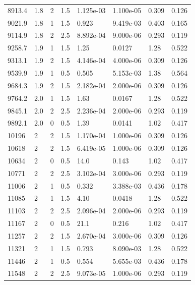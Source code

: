 \documentclass[preview]{standalone}
\begin{document}
{{{\begin{tabular}{L{1.2cm}C{1.2cm} C{0.3cm}C{0.5cm} C{1.4cm}C{1.4cm} C{1.4cm}C{1.4cm}}
  8913.4  &   1.8  & 2     & 1.5 &  1.125e-03  & 1.100e-05  & 0.309 &  0.126   \\ 
  9021.9  &   1.8  & 1     & 1.5 &  0.923  & 9.419e-03  & 0.403 &  0.165   \\ 
  9114.9  &   1.8  & 2     & 2.5 &  8.892e-04  & 9.000e-06  & 0.293 &  0.119   \\ 
  9258.7  &   1.9  & 1     & 1.5 &  1.25  & 0.0127  & 1.28 &  0.522   \\ 
  9313.1  &   1.9  & 2     & 1.5 &  4.146e-04  & 4.000e-06  & 0.309 &  0.126   \\ 
  9539.9  &   1.9  & 1     & 0.5 &  0.505  & 5.153e-03  & 1.38 &  0.564   \\ 
  9684.3  &   1.9  & 2     & 1.5 &  2.182e-04  & 2.000e-06  & 0.309 &  0.126   \\ 
  9764.2  &   2.0  & 1     & 1.5 &  1.63  & 0.0167  & 1.28 &  0.522   \\ 
  9845.1  &   2.0  & 2     & 2.5 &  2.236e-04  & 2.000e-06  & 0.293 &  0.119   \\ 
  9892.1  &   2.0  & 0     & 0.5 &  1.39  & 0.0141  & 1.02 &  0.417   \\ 
  10196  &     2  & 2     & 1.5 &  1.170e-04  & 1.000e-06  & 0.309 &  0.126   \\ 
  10618  &     2  & 2     & 1.5 &  6.419e-05  & 1.000e-06  & 0.309 &  0.126   \\ 
  10634  &     2  & 0     & 0.5 &  14.0  & 0.143  & 1.02 &  0.417   \\ 
  10771  &     2  & 2     & 2.5 &  3.102e-04  & 3.000e-06  & 0.293 &  0.119   \\ 
  11006  &     2  & 1     & 0.5 &  0.332  & 3.388e-03  & 0.436 &  0.178   \\ 
  11085  &     2  & 1     & 1.5 &  4.10  & 0.0418  & 1.28 &  0.522   \\ 
  11103  &     2  & 2     & 2.5 &  2.096e-04  & 2.000e-06  & 0.293 &  0.119   \\ 
  11167  &     2  & 0     & 0.5 &  21.1  & 0.216  & 1.02 &  0.417   \\ 
  11257  &     2  & 2     & 1.5 &  2.670e-04  & 3.000e-06  & 0.309 &  0.126   \\ 
  11321  &     2  & 1     & 1.5 &  0.793  & 8.090e-03  & 1.28 &  0.522   \\ 
  11446  &     2  & 1     & 0.5 &  0.554  & 5.655e-03  & 0.436 &  0.178   \\ 
  11548  &     2  & 2     & 2.5 &  9.073e-05  & 1.000e-06  & 0.293 &  0.119   \\ 

\end{tabular}}}}
\end{document}
